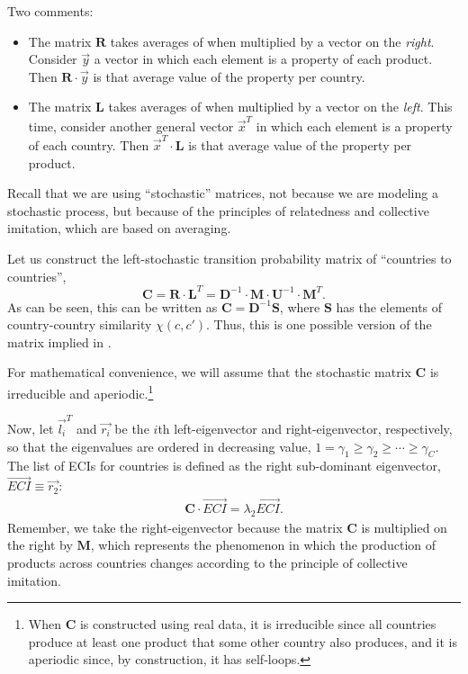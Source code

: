\documentclass[12pt]{article}
\newcommand{\mtx}[1]{\mathbf{ #1}}
\begin{document}
Two comments:
\begin{itemize}
	\item The matrix $\mtx{R}$ takes averages of when multiplied by a vector on the \emph{right}. Consider $\vec{y}$ a vector in which each element is a property of each product. 
	Then $\mtx{R}\cdot \vec{y}$ is that average value of the property per country.
	\item The matrix $\mtx{L}$ takes averages of when multiplied by a vector on the \emph{left}. This time, consider another general vector $\vec{x}^T$ in which each element is a property of each country. Then $\vec{x}^T\cdot\mtx{L}$ is that average value of the property per product.
\end{itemize}
Recall that we are using ``stochastic'' matrices, not because we are modeling a stochastic process, but because of the principles of relatedness and collective imitation, which are based on averaging.

Let us construct the left-stochastic transition probability matrix of ``countries to countries'', $$\mtx{C}=\mtx{R}\cdot\mtx{L}^T=\mtx{D}^{-1}\cdot\mtx{M}\cdot\mtx{U}^{-1}\cdot\mtx{M}^T.$$ As can be seen, this can be written as $\mtx{C} = \mtx{D}^{-1}\mtx{S}$, where $\mtx{S}$ has the elements of country-country similarity $\chi(c,c')$. Thus, this is one possible version of the matrix implied in .

For mathematical convenience, we will assume that the stochastic matrix $\mtx{C}$ is irreducible and aperiodic.\footnote{When $\mtx{C}$ is constructed using real data, it is irreducible since all countries produce at least one product that some other country also produces, and it is aperiodic since, by construction, it has self-loops.} 

Now, let $\vec{l_i}^T$ and $\vec{r_i}$ be the $i$th left-eigenvector and right-eigenvector, respectively, so that the eigenvalues are ordered in decreasing value, $1=\gamma_1\geq \gamma_2\geq\cdots\geq \gamma_C$. The list of ECIs for countries is defined as the right sub-dominant eigenvector, $\vec{ECI}\equiv \vec{r_2}$:
\begin{align}
	\mtx{C}\cdot\vec{ECI}=\lambda_2 \vec{ECI}.
\label{eqn:drag}
\end{align}
Remember, we take the right-eigenvector because the matrix $\mtx{C}$ is multiplied on the right by $\mtx{M}$, which represents the phenomenon in which the production of products across countries changes according to the principle of collective imitation.
\end{document}
